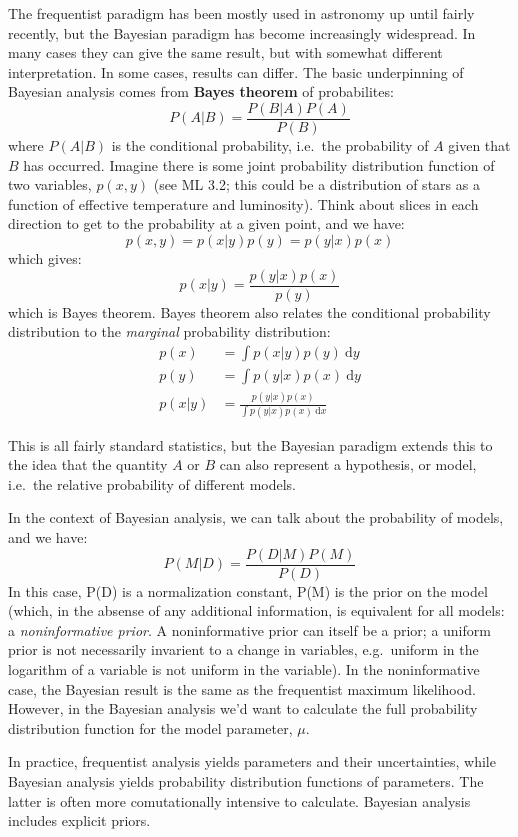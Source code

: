 \documentclass[12pt]{article}
\begin{document}
The frequentist paradigm has been mostly used in astronomy up until fairly
recently, but the Bayesian paradigm has become increasingly widespread. In
many cases they can give the same result, but with somewhat different
interpretation. In some cases, results can differ. The basic underpinning of
Bayesian analysis comes from \textbf{Bayes theorem} of probabilites:
    $$ P(A|B) = \frac{P(B|A)P(A)}{P(B)} $$
where $P(A|B)$ is the conditional probability, i.e.\ the probability of $A$ given
that $B$ has occurred. Imagine there is some joint probability distribution
function of two variables, $p(x,y)$ (see ML 3.2; this could be a distribution
of stars as a function of effective temperature and luminosity). Think about
slices in each direction to get to the probability at a given point, and we
have:
    $$ p(x,y) = p(x|y)p(y) = p(y|x)p(x) $$
which gives:
    $$ p(x|y) = \frac{p(y|x)p(x)}{p(y)} $$
which is Bayes theorem. Bayes theorem also relates the conditional probability
distribution to the \emph{marginal} probability distribution:
\begin{align*}
    p(x) &= \int \! p(x|y)p(y) \ \mathrm{d}y \\
    p(y) &= \int \! p(y|x)p(x) \ \mathrm{d}y \\
    p(x|y) &= \frac{p(y|x)p(x)}{\int \! p(y|x)p(x) \ \mathrm{d}x}
\end{align*}

This is all fairly standard statistics, but the Bayesian paradigm extends
this to the idea that the quantity $A$ or $B$ can also represent a hypothesis,
or model, i.e.\ the relative probability of different models.

In the context of Bayesian analysis, we can talk about the probability of models,
and we have:
    $$ P(M|D) = \frac{P(D|M)P(M)}{P(D)} $$
In this case, P(D) is a normalization constant, P(M) is the prior on the model
(which, in the absense of any additional information, is equivalent for all
models: a \emph{noninformative prior}. A noninformative prior can itself be
a prior; a uniform prior is not necessarily invarient to a change in
variables, e.g.\ uniform in the logarithm of a variable is not uniform in the
variable). In the noninformative case, the Bayesian result is the same as the
frequentist maximum likelihood. However, in the Bayesian analysis we'd want
to calculate the full probability distribution function for the model parameter,
$\mu$.

In practice, frequentist analysis yields parameters and their uncertainties,
while Bayesian analysis yields probability distribution functions of parameters.
The latter is often more comutationally intensive to calculate. Bayesian analysis
includes explicit priors.
\end{document}
